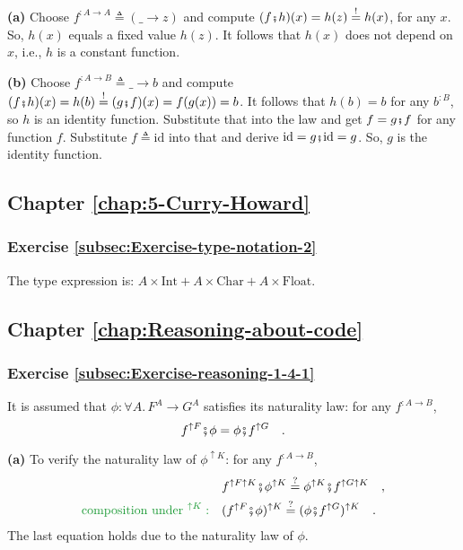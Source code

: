 \textbf{(a)} Choose $f^{:A\rightarrow A}\triangleq(\_\rightarrow z)$
and compute $(f\bef h)(x)=h(z)\overset{!}{=}h(x)$, for any $x$.
So, $h(x)$ equals a fixed value $h(z)$. It follows that $h(x)$
does not depend on $x$, i.e., $h$ is a constant function.

\textbf{(b)} Choose $f^{:A\rightarrow B}\triangleq\_\rightarrow b$
and compute $(f\bef h)(x)=h(b)\overset{!}{=}(g\bef f)(x)=f(g(x))=b$.
It follows that $h(b)=b$ for any $b^{:B}$, so $h$ is an identity
function. Substitute that into the law and get $f=g\bef f$ for any
function $f$. Substitute $f\triangleq\text{id}$ into that and derive
$\text{id}=g\bef\text{id}=g$. So, $g$ is the identity function.

\subsection*{Chapter \ref{chap:5-Curry-Howard}}

\subsubsection*{Exercise \ref{subsec:Exercise-type-notation-2}}

The type expression is: $A\times\text{Int}+A\times\text{Char}+A\times\text{Float}$.

\subsection*{Chapter \ref{chap:Reasoning-about-code}}

\subsubsection*{Exercise \ref{subsec:Exercise-reasoning-1-4-1}}

It is assumed that $\phi:\forall A.\,F^{A}\rightarrow G^{A}$ satisfies
its naturality law: for any $f^{:A\rightarrow B}$,
\[
f^{\uparrow F}\bef\phi=\phi\bef f^{\uparrow G}\quad.
\]

\textbf{(a)} To verify the naturality law of $\phi^{\uparrow K}$:
for any $f^{:A\rightarrow B}$,
\begin{align*}
 & f^{\uparrow F\uparrow K}\bef\phi^{\uparrow K}\overset{?}{=}\phi^{\uparrow K}\bef f^{\uparrow G\uparrow K}\quad,\\
{\color{greenunder}\text{composition under }^{\uparrow K}:}\quad & (f^{\uparrow F}\bef\phi)^{\uparrow K}\overset{?}{=}(\phi\bef f^{\uparrow G})^{\uparrow K}\quad.
\end{align*}
The last equation holds due to the naturality law of $\phi$.

